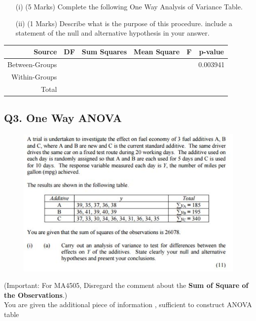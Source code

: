 \documentclass[a4paper,12pt]{article}
\begin{document}
	\begin{itemize}
		\item[(i)] (5 Marks) Complete the following One Way Analysis of Variance Table.
		\item[(ii)] (1 Marks) Describe what is the purpose of this procedure. include a statement of the null and alternative hypothesis in your answer.
	\end{itemize}
	\begin{tabular}{|r|c|c|c|c|c|}
		\hline Source  &\phantom{sp} DF \phantom{sp} & Sum Squares & Mean Square  & \phantom{sp} F \phantom{sp} & p-value  \\ 
		\hline Between-Groups &  &  &  &  & 0.003941 \\ 
		\hline Within-Groups &  &  &  &  &  \\ \hline
		\hline Total &  &  &  &  &  \\ 
		\hline 
	\end{tabular} 
	
\newpage
	
\subsection*{Q3. One Way ANOVA } %


\begin{figure}[h!]
	\centering
	\includegraphics[width=1.0\linewidth]{image/Q23Review}
\end{figure}
\noindent (Important: For MA4505, Disregard the comment about the \textbf{Sum of Square of the Observations}.)\\
You are given the additional piece of information , sufficient to construct ANOVA table
\end{document}
